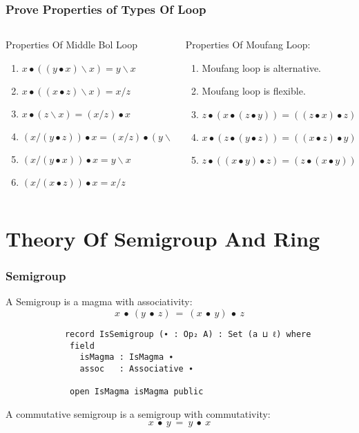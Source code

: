 \documentclass[xcolor={dvipsnames}]{beamer}
\begin{document}

  \begin{frame}[fragile]
    \frametitle{Prove Properties of Types Of Loop}  
    \begin{columns}
      \begin{column}{0.4\textwidth}
        Properties Of Middle Bol Loop
        \begin{enumerate}
        \item \(x∙((y∙x)\backslash x)=y\backslash x\) 
        \item \(x∙((x∙z)\backslash x)=x/z\)
        \item \(x∙ (z\backslash x)=(x/z)∙x\)
        \item \((x/(y∙z))∙x=(x/z)∙(y\backslash x)\)
        \item \((x/(y∙x))∙x=y\backslash x\)
        \item \((x/(x∙z))∙x= x/ z\)
        \end{enumerate}
      \end{column}
      \hfill
      \begin{column}{0.575\textwidth}
        Properties Of Moufang Loop:
        \begin{enumerate}
        \item Moufang loop is alternative.
        \item Moufang loop is flexible.
        \item $z∙(x∙(z∙y))=((z∙x)∙z)∙y$
        \item $x∙(z∙(y∙z))=((x∙z)∙y)∙z$ 
        \item $z∙((x∙y)∙z)=(z∙ (x∙y))∙z$ 
        \end{enumerate}
      \end{column}
    \end{columns}
  \end{frame}

\section{Theory Of Semigroup And Ring}

\begin{frame}[fragile]
    \frametitle{Semigroup} 
     A Semigroup is a magma with associativity: 
     \[x\ ∙\ (y\ ∙\ z)\ =\ (x\ ∙\ y)\ ∙\ z\]  
        \begin{verbatim}
            record IsSemigroup (∙ : Op₂ A) : Set (a ⊔ ℓ) where
             field
               isMagma : IsMagma ∙
               assoc   : Associative ∙
            
             open IsMagma isMagma public
          \end{verbatim}
        A commutative semigroup is a semigroup with commutativity:
        \[x\ ∙\ y\ =\ y\ ∙\ x\]
  \end{frame}
\end{document}
